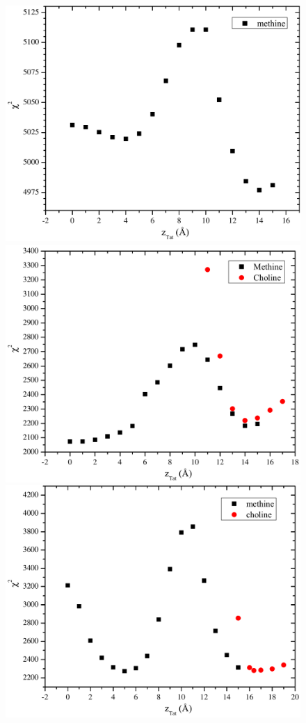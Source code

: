 \begin{figure}[htbp]
  \centering
  \includegraphics[scale=0.3]{./figures/Tat/SDP_Results/DOPCDOPE3to1_Tat_62to1_X2}
  \includegraphics[scale=0.3]{./figures/Tat/SDP_Results/DOPCDOPE3to1_Tat_28to1_X2}
  \includegraphics[scale=0.3]{./figures/Tat/SDP_Results/DOPCDOPE3to1_Tat_16to1_X2}

\end{figure}
